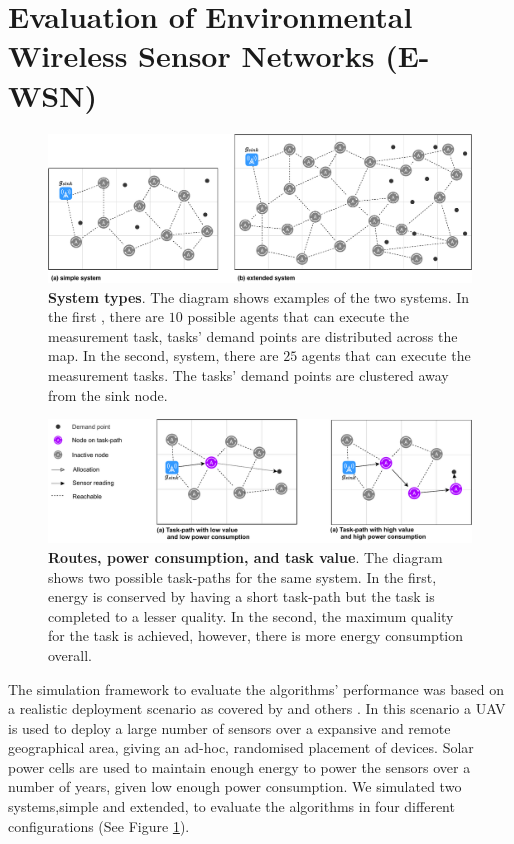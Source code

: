 \section{Evaluation of Environmental Wireless Sensor Networks (E-WSN)}
\label{section:experimental}	
\begin{figure}[ht]
	\centering
	\includegraphics[width=0.9\linewidth, trim={25pt 0pt 25pt 0pt, clip}]{system-types}
	\caption{\textbf{System types}. The diagram shows examples of the two systems. In the first \simulationSimple{}{}, there are $10$ possible agents that can execute the measurement task, tasks' demand points are distributed across the map. In the second, \simulationExtended{}{} system, there are $25$ agents that can execute the measurement tasks. The tasks' demand points are clustered away from the sink node.}
	\label{fig:system-types}
\end{figure}
\begin{figure}[ht]
	\centering
	\includegraphics[width=0.9\linewidth, trim={25pt 0pt 25pt 0pt, clip}]{route-types}
	\caption{\textbf{Routes, power consumption, and task value}. The diagram shows two possible task-paths for the same system. In the first, energy is conserved by having a short task-path but the task is completed to a lesser quality. In the second, the maximum quality for the task is achieved, however, there is more energy consumption overall.}
	\label{fig:route_types}
\end{figure}
The simulation framework to evaluate the algorithms' performance was based on a realistic deployment scenario as covered by  \cite{Gomez2015} and others \citep{Jha2016, Avram}. In this scenario a UAV is used to deploy a large number of sensors over a expansive and remote geographical area, giving an ad-hoc, randomised placement of devices. Solar power cells are used to maintain enough energy to power the sensors over a number of years, given low enough power consumption. We simulated two systems,simple and extended, to evaluate the algorithms in four different configurations (See Figure \ref{fig:system-types}).

